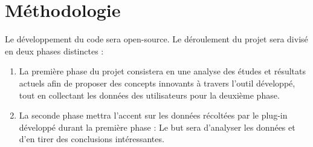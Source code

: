 \section{Méthodologie}

	Le développement du code sera \gls{open-source}. Le déroulement du projet sera divisé en deux phases distinctes : 

	\begin{enumerate}
		\item La première phase du projet consistera en une analyse des études et résultats actuels afin de proposer des concepts innovants à travers l'outil développé, tout en collectant les données des utilisateurs pour la deuxième phase.
		\item La seconde phase mettra l'accent sur les données récoltées par le plug-in développé durant la première phase : Le but sera d'analyser les données et d'en tirer des conclusions intéressantes.
	\end{enumerate}
